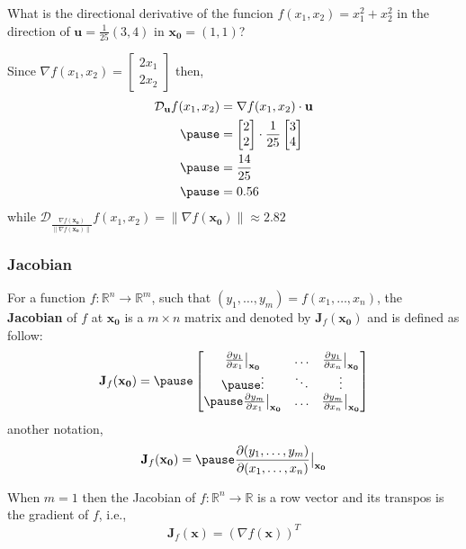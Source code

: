 \documentclass[12pt,aspectratio=169]{beamer}
\renewcommand{\Re}{\mathbb{R}}
\newcommand{\at}[2][]{#1|_{#2}}
\begin{document}
\begin{frame}
What is the directional derivative of the funcion $f(x_1,x_2)=x_1^2+x_2^2$ in the direction of $\mathbf{u}=\frac{1}{25}(3,4)$ in $\mathbf{x_0}=(1,1)$?\pause

Since $\nabla f(x_1,x_2)=\begin{bmatrix}
2x_1\\
2x_2
\end{bmatrix}$ then,\pause
\[
\begin{aligned}
\mathcal{D}_{\mathbf{u}}f(x_1,x_2)&=\nabla f(x_1,x_2)\cdot \mathbf{u}\\ \pause
&=\begin{bmatrix}
2\\
2
\end{bmatrix} \cdot \frac{1}{25}\begin{bmatrix}
3\\
4
\end{bmatrix}  \\ \pause
&=\frac{14}{25}\\ \pause
&=0.56
\end{aligned}
\] \pause
while $\mathcal{D}_{\frac{\nabla f(\mathbf{x_0})}{\|\nabla f(\mathbf{x_0})\|}}f(x_1,x_2)=\|\nabla f(\mathbf{x_0})\|\approx 2.82$
\end{frame}

\begin{frame}
\frametitle{Jacobian}
For a function $f:\Re^n\to \Re^m$, such that $(y_1,\dots,y_m)=f(x_1,\dots,x_n)$, the \textbf{Jacobian} of $f$ at $\mathbf{x_0}$ is a $m\times n$ matrix and denoted by $\mathbf{J}_f(\mathbf{x_0})$ and is defined as follow:\pause
\[
\mathbf{J}_f(\mathbf{x_0})=\pause
\begin{bmatrix}
\frac{\partial y_1}{\partial x_1}\at[\big]{\mathbf{x_0}} & \dots & \frac{\partial y_1}{\partial x_n}\at[\big]{\mathbf{x_0}} \\ \pause
\vdots & \ddots & \vdots \\ \pause
\frac{\partial y_m}{\partial x_1}\at[\big]{\mathbf{x_0}} & \dots & \frac{\partial y_m}{\partial x_n}\at[\big]{\mathbf{x_0}}
\end{bmatrix}
\] \pause
another notation, \pause
\[
\mathbf{J}_f(\mathbf{x_0})=\pause\frac{\partial (y_1,\dots,y_m)}{\partial (x_1,\dots, x_n)}\at[\big]{\mathbf{x_0}}
\]
\end{frame}

\begin{frame}
When $m=1$ then the Jacobian of $f:\Re^n\to \Re$ is a row vector and its transpos is the gradient of $f$, i.e.,\pause
\[
\mathbf{J}_f(\mathbf{x})=(\nabla f(\mathbf{x}))^T
\]
\end{frame}
\end{document}
